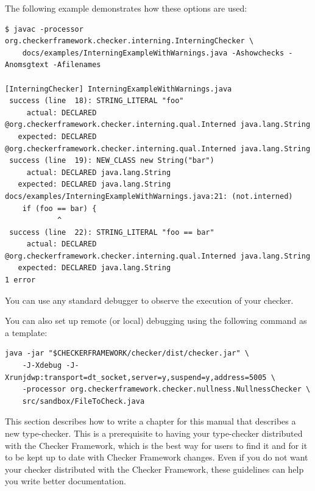 
The following example demonstrates how these options are used:

\begin{smaller}
\begin{Verbatim}
$ javac -processor org.checkerframework.checker.interning.InterningChecker \
    docs/examples/InterningExampleWithWarnings.java -Ashowchecks -Anomsgtext -Afilenames

[InterningChecker] InterningExampleWithWarnings.java
 success (line  18): STRING_LITERAL "foo"
     actual: DECLARED @org.checkerframework.checker.interning.qual.Interned java.lang.String
   expected: DECLARED @org.checkerframework.checker.interning.qual.Interned java.lang.String
 success (line  19): NEW_CLASS new String("bar")
     actual: DECLARED java.lang.String
   expected: DECLARED java.lang.String
docs/examples/InterningExampleWithWarnings.java:21: (not.interned)
    if (foo == bar) {
            ^
 success (line  22): STRING_LITERAL "foo == bar"
     actual: DECLARED @org.checkerframework.checker.interning.qual.Interned java.lang.String
   expected: DECLARED java.lang.String
1 error
\end{Verbatim}
\end{smaller}


You can use any standard debugger to observe the execution of your checker.

You can also set up remote (or local) debugging using the following command as a template:

\begin{Verbatim}
java -jar "$CHECKERFRAMEWORK/checker/dist/checker.jar" \
    -J-Xdebug -J-Xrunjdwp:transport=dt_socket,server=y,suspend=y,address=5005 \
    -processor org.checkerframework.checker.nullness.NullnessChecker \
    src/sandbox/FileToCheck.java

\end{Verbatim}



This section describes how to write a chapter for this manual that
describes a new type-checker.  This is a prerequisite to having your
type-checker distributed with the Checker Framework, which is the best way
for users to find it and for it to be kept up to date with Checker
Framework changes.  Even if you do not want your checker distributed with
the Checker Framework, these guidelines can help you write better
documentation.

